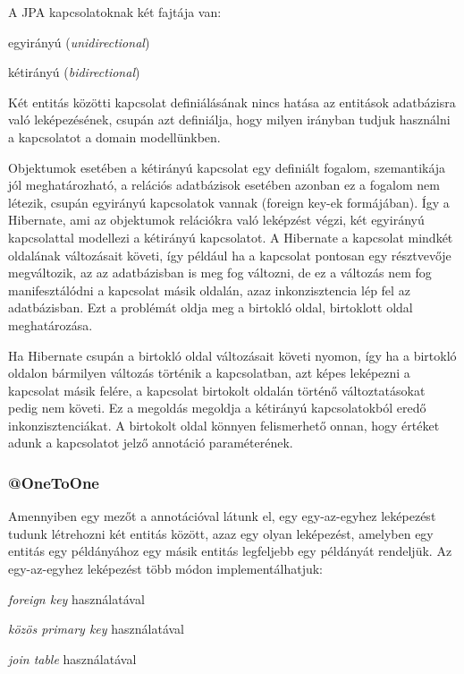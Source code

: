A JPA kapcsolatoknak két fajtája van:
\begin{listing}
	\item egyirányú (\emph{unidirectional})
	\item kétirányú (\emph{bidirectional})
\end{listing}

Két entitás közötti kapcsolat definiálásának nincs hatása az entitások adatbázisra való leképezésének, csupán azt definiálja, hogy milyen irányban tudjuk használni a kapcsolatot a domain modellünkben. \par

Objektumok esetében a kétirányú kapcsolat egy definiált fogalom, szemantikája jól meghatározható, a relációs adatbázisok esetében azonban ez a fogalom nem létezik, csupán egyirányú kapcsolatok vannak (foreign key-ek formájában). Így a Hibernate, ami az objektumok relációkra való leképzést végzi, két egyirányú kapcsolattal modellezi a kétirányú kapcsolatot. A Hibernate a kapcsolat mindkét oldalának változásait követi, így például ha a kapcsolat pontosan egy résztvevője megváltozik, az az adatbázisban is meg fog változni, de ez a változás nem fog manifesztálódni a kapcsolat másik oldalán, azaz inkonzisztencia lép fel az adatbázisban. Ezt a problémát oldja meg a birtokló oldal, birtoklott oldal meghatározása. \par

Ha Hibernate csupán a birtokló oldal változásait követi nyomon, így ha a birtokló oldalon bármilyen változás történik a kapcsolatban, azt képes leképezni a kapcsolat másik felére, a kapcsolat birtokolt oldalán történő változtatásokat pedig nem követi. Ez a megoldás megoldja a kétirányú kapcsolatokból eredő inkonzisztenciákat. A birtokolt oldal könnyen felismerhető onnan, hogy értéket adunk a kapcsolatot jelző annotáció  paraméterének. \par

\subsubsection{@OneToOne}

Amennyiben egy mezőt a  annotációval látunk el, egy egy-az-egyhez leképezést tudunk létrehozni két entitás között, azaz egy olyan leképezést, amelyben egy entitás egy példányához egy másik entitás legfeljebb egy példányát rendeljük. Az egy-az-egyhez leképezést több módon implementálhatjuk:

\begin{listing}
	\item \emph{foreign key} használatával
	\item \emph{közös primary key} használatával
	\item \emph{join table} használatával
\end{listing}


